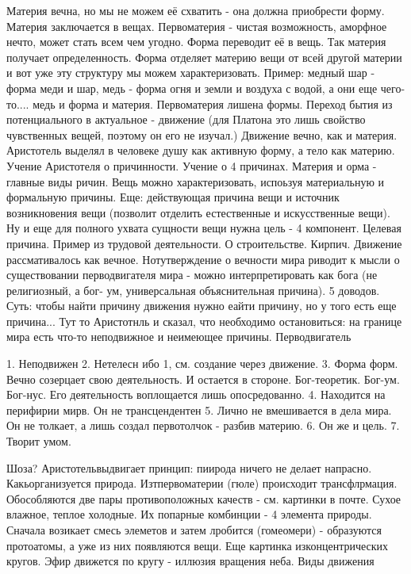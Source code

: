 Материя вечна, но мы не можем её схватить - она должна приобрести форму. Материя заключается в вещах. Первоматерия - чистая возможность, аморфное нечто, может стать всем чем угодно. Форма переводит её в вещь. Так материя получает определенность. Форма отделяет материю вещи от всей другой материи и вот уже эту структуру мы можем характеризовать. Пример: медный шар - форма меди и шар, медь - форма огня и земли и воздуха с водой, а они еще чего-то.... медь и форма и материя. Первоматерия лишена формы. Переход бытия из потенциального в актуальное - движение (для Платона это лишь свойство чувственных вещей, поэтому он его не изучал.) Движение вечно, как и материя.
Аристотель выделял в человеке душу как активную форму, а тело как материю.
Учение Аристотеля о причинности. Учение о 4 причинах. Материя и орма - главные виды ричин. Вещь можно характеризовать, испоьзуя материальную и формальную причины. Еще: действующая причина вещи и источник возникновения вещи (позволит отделить естественные и искусственные вещи). Ну и еще для полного ухвата сущности вещи нужна цель - 4 компонент. Целевая причина.
Пример из трудовой деятельности. О строительстве. Кирпич.
Движение рассмативалось как вечное. Нотутверждение о вечности мира риводит к мысли о существовании перводвигателя мира - можно интерпретировать как бога (не религиозный, а бог- ум, универсальная объяснительная причина). 5 доводов. Суть: чтобы найти причину движения нужно еайти причину, но у того есть еще причина... Тут то Аристотнль  и сказал, что необходимо остановиться: на границе мира есть что-то неподвижное и неимеющее причины.
Перводвигатель

	1. Неподвижен
	2. Нетелесн ибо 1, см. создание через движение.
	3. Форма форм. Вечно созерцает свою деятельность. И остается в стороне. Бог-теоретик. Бог-ум. Бог-нус. Его деятельность воплощается лишь опосредованно.
	4. Находится на перифирии мирв. Он не трансцендентен
	5. Лично не вмешивается в дела мира. Он не толкает, а лишь создал первотолчок - разбив материю.
	6. Он же и цель.
	7. Творит умом.

Шоза?
Аристотельвыдвигает принцип: пиирода ничего не делает напрасно. Какьорганизуется природа. Изтпервоматерии (гюле) происходит трансфлрмация. Обособляются две пары противоположных качеств - см. картинки в почте. Сухое влажное, теплое холодные. Их попарные комбинции - 4 элемента природы. Сначала возикает смесь элеметов и затем лробится (гомеомери) - образуются протоатомы, а уже из них появляются вещи.
Еще картинка изконцентрических кругов. Эфир движется по кругу - иллюзия вращения неба.
Виды движения

